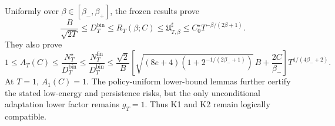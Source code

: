 Uniformly over \(\beta\in[\beta_-,\beta_+]\), the frozen results prove \[\frac{B}{\sqrt{2T}}\le D_T^{\mathrm{bin}}\le R_T(\beta;C)\le\mathfrak U_{T,\beta}^{\sharp}\le C_0^\star T^{-\beta/(2\beta+1)}.\] They also prove \[1\le A_T(C)\le\frac{N_T^\star}{D_T^{\mathrm{bin}}}\le\frac{N_T^{\mathrm{fin}}}{D_T^{\mathrm{bin}}}\le\frac{\sqrt2}{B}\left[\sqrt{(8e+4)\left(1+2^{-1/(2\beta_-+1)}\right)}\,B+\frac{2C}{\beta_-}\right]T^{1/(4\beta_-+2)}.\] At \(T=1\), \(A_1(C)=1\). The policy-uniform lower-bound lemmas further certify the stated low-energy and persistence risks, but the only unconditional adaptation lower factor remains \(g_T=1\). Thus K1 and K2 remain logically compatible.